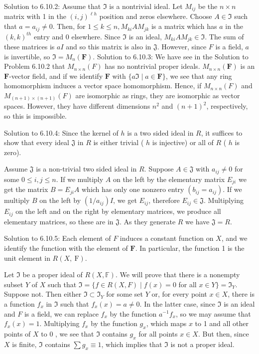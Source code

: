 \documentclass[10pt]{article}
\begin{document}
Solution to 6.10.2: Assume that $\mathfrak{I}$ is a nontrivial ideal. Let $M_{i j}$ be the $n \times n$ matrix with 1 in the $(i, j)^{\ell h}$ position and zeros elsewhere. Choose $A \in \mathfrak{I}$ such that $a=a_{i j} \neq 0$. Then, for $1 \leqslant k \leqslant n, M_{k i} A M_{j k}$ is a matrix which has $a$ in the $(k, k)^{t h}$ entry and 0 elsewhere. Since $\mathfrak{I}$ is an ideal, $M_{k i} A M_{j k} \in \mathfrak{I}$. The sum of these matrices is $a I$ and so this matrix is also in $\mathfrak{J}$. However, since $F$ is a field, $a$ is invertible, so $\mathfrak{I}=M_{n}(\mathbf{F})$. Solution to 6.10.3: We have see in the Solution to Problem 6.10.2 that $M_{n \times n}(F)$ has no nontrivial proper ideals. $M_{n \times n}(\mathbf{F})$ is an $\mathbf{F}$-vector field, and if we identify $\mathbf{F}$ with $\{a \mathfrak{I} \mid a \in \mathbf{F}\}$, we see that any ring homomorphism induces a vector space homomorphism. Hence, if $M_{n \times n}(F)$ and $M_{(n+1) \times(n+1)}(F)$ are isomorphic as rings, they are isomorphic as vector spaces. However, they have different dimensions $n^{2}$ and $(n+1)^{2}$, respectively, so this is impossible.

Solution to 6.10.4: Since the kernel of $h$ is a two sided ideal in $R$, it suffices to show that every ideal $\mathfrak{J}$ in $R$ is either trivial ( $h$ is injective) or all of $R$ ( $h$ is zero).

Assume $\mathfrak{J}$ is a non-trivial two sided ideal in $R$. Suppose $A \in \mathfrak{J}$ with $a_{i j} \neq 0$ for some $0 \leqslant i, j \leqslant n$. If we multiply $A$ on the left by the elementary matrix $E_{j i}$ we get the matrix $B=E_{j i} A$ which has only one nonzero entry $\left(b_{i j}=a_{i j}\right)$. If we multiply $B$ on the left by $\left(1 / a_{i j}\right) I$, we get $E_{i j}$, therefore $E_{i j} \in \mathfrak{J}$. Multiplying $E_{i j}$ on the left and on the right by elementary matrices, we produce all elementary matrices, so these are in $\mathfrak{J}$. As they generate $R$ we have $\mathfrak{J}=R$.

Solution to 6.10.5: Each element of $F$ induces a constant function on $X$, and we identify the function with the element of $\mathbf{F}$. In particular, the function 1 is the unit element in $R(X, \mathrm{~F})$.

Let $\mathfrak{I}$ be a proper ideal of $R(X, \mathbb{F})$. We will prove that there is a nonempty subset $Y$ of $X$ such that $\mathfrak{I}=\{f \in R(X, F) \mid f(x)=0$ for all $x \in Y\}=\mathfrak{I}_{Y}$. Suppose not. Then either $\mathfrak{I} \subset \mathfrak{I}_{Y}$ for some set $Y$ or, for every point $x \in X$, there is a function $f_{x}$ in $\mathfrak{I}$ such that $f_{x}(x)=a \neq 0$. In the latter case, since $\mathfrak{I}$ is an ideal and $F$ is a field, we can replace $f_{x}$ by the function $a^{-1} f_{x}$, so we may assume that $f_{x}(x)=1$. Multiplying $f_{x}$ by the function $g_{x}$, which maps $x$ to 1 and all other points of $X$ to 0 , we see that $\mathfrak{I}$ contains $g_{x}$ for all points $x \in X$. But then, since $X$ is finite, $\mathfrak{I}$ contains $\sum g_{x} \equiv 1$, which implies that $\mathfrak{I}$ is not a proper ideal.
\end{document}
